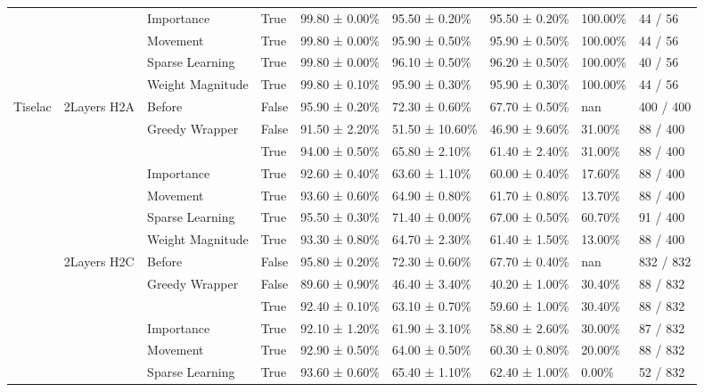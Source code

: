 \begin{tabular}{lllllllll}
\cline{3-9}
 &  & Importance & True & 99.80 ± 0.00\% & 95.50 ± 0.20\% & 95.50 ± 0.20\% & 100.00\% & 44 / 56 \\
\cline{3-9}
 &  & Movement & True & 99.80 ± 0.00\% & 95.90 ± 0.50\% & 95.90 ± 0.50\% & 100.00\% & 44 / 56 \\
\cline{3-9}
 &  & Sparse Learning & True & 99.80 ± 0.00\% & 96.10 ± 0.50\% & 96.20 ± 0.50\% & 100.00\% & 40 / 56 \\
\cline{3-9}
 &  & Weight Magnitude & True & 99.80 ± 0.10\% & 95.90 ± 0.30\% & 95.90 ± 0.30\% & 100.00\% & 44 / 56 \\
\cline{1-9} \cline{2-9} \cline{3-9}
\multirow[t]{35}{*}{Tiselac} & \multirow[t]{7}{*}{2Layers H2A} & Before & False & 95.90 ± 0.20\% & 72.30 ± 0.60\% & 67.70 ± 0.50\% & nan & 400 / 400 \\
\cline{3-9}
 &  & \multirow[t]{2}{*}{Greedy Wrapper} & False & 91.50 ± 2.20\% & 51.50 ± 10.60\% & 46.90 ± 9.60\% & 31.00\% & 88 / 400 \\
 &  &  & True & 94.00 ± 0.50\% & 65.80 ± 2.10\% & 61.40 ± 2.40\% & 31.00\% & 88 / 400 \\
\cline{3-9}
 &  & Importance & True & 92.60 ± 0.40\% & 63.60 ± 1.10\% & 60.00 ± 0.40\% & 17.60\% & 88 / 400 \\
\cline{3-9}
 &  & Movement & True & 93.60 ± 0.60\% & 64.90 ± 0.80\% & 61.70 ± 0.80\% & 13.70\% & 88 / 400 \\
\cline{3-9}
 &  & Sparse Learning & True & 95.50 ± 0.30\% & 71.40 ± 0.00\% & 67.00 ± 0.50\% & 60.70\% & 91 / 400 \\
\cline{3-9}
 &  & Weight Magnitude & True & 93.30 ± 0.80\% & 64.70 ± 2.30\% & 61.40 ± 1.50\% & 13.00\% & 88 / 400 \\
\cline{2-9} \cline{3-9}
 & \multirow[t]{7}{*}{2Layers H2C} & Before & False & 95.80 ± 0.20\% & 72.30 ± 0.60\% & 67.70 ± 0.40\% & nan & 832 / 832 \\
\cline{3-9}
 &  & \multirow[t]{2}{*}{Greedy Wrapper} & False & 89.60 ± 0.90\% & 46.40 ± 3.40\% & 40.20 ± 1.00\% & 30.40\% & 88 / 832 \\
 &  &  & True & 92.40 ± 0.10\% & 63.10 ± 0.70\% & 59.60 ± 1.00\% & 30.40\% & 88 / 832 \\
\cline{3-9}
 &  & Importance & True & 92.10 ± 1.20\% & 61.90 ± 3.10\% & 58.80 ± 2.60\% & 30.00\% & 87 / 832 \\
\cline{3-9}
 &  & Movement & True & 92.90 ± 0.50\% & 64.00 ± 0.50\% & 60.30 ± 0.80\% & 20.00\% & 88 / 832 \\
\cline{3-9}
 &  & Sparse Learning & True & 93.60 ± 0.60\% & 65.40 ± 1.10\% & 62.40 ± 1.00\% & 0.00\% & 52 / 832 \\

\end{tabular}
